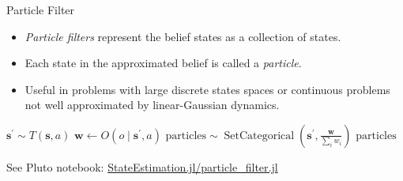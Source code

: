 \begin{frame}[fragile]{Particle Filter}


\begin{itemize}
    \item \textit{Particle filters} represent the belief states as a collection of states.
    \item Each state in the approximated belief is called a \textit{particle}.
    \item Useful in problems with large discrete states spaces or continuous problems not well approximated by linear-Gaussian dynamics.
\end{itemize}

\pause
\setcounter{algorithm}{0}
\begin{algorithm}[H]
    \caption{Particle filter algorithm.}
    \label{alg:particle_filter}
    \begin{algorithmic}
    \pause \State $\mathbf{s}^\prime \sim T(\mathbf{s}, a)$ 
    \pause \State $\mathbf{w} \leftarrow O(o \mid \mathbf{s}^\prime, a)$ 
    \pause \State $\text{particles} \sim \operatorname{SetCategorical}\left(\mathbf{s}^\prime, \frac{\mathbf{w}}{\sum_i w_i}\right)$ 
    \pause \State \Return $\text{particles}$
    \EndFunction
    \end{algorithmic}
\end{algorithm}

\pause See Pluto notebook: \href{http://htmlview.glitch.me/?https://raw.githubusercontent.com/sisl/StateEstimation.jl/master/html/particle_filter.html}{\color{cardinal}StateEstimation.jl/particle\_filter.jl}

\end{frame}